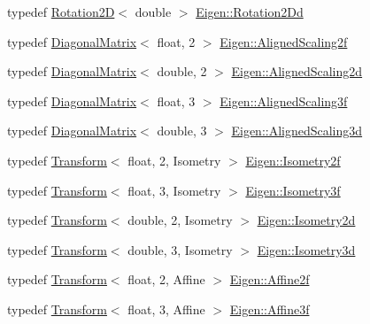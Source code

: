\begin{DoxyCompactItemize}
typedef \mbox{\hyperlink{class_eigen_1_1_rotation2_d}{Rotation2D}}$<$ double $>$ \mbox{\hyperlink{group___geometry___module_gab7af1ccdfb6c865c27fe1fd6bd9e759f}{Eigen\+::\+Rotation2\+Dd}}
\item 
typedef \mbox{\hyperlink{class_eigen_1_1_diagonal_matrix}{Diagonal\+Matrix}}$<$ float, 2 $>$ \mbox{\hyperlink{group___geometry___module_gaf2440178a1f5f6abef6ee0231bc49184}{Eigen\+::\+Aligned\+Scaling2f}}
\item 
typedef \mbox{\hyperlink{class_eigen_1_1_diagonal_matrix}{Diagonal\+Matrix}}$<$ double, 2 $>$ \mbox{\hyperlink{group___geometry___module_gaf8975289b8134a5021e806029516e82c}{Eigen\+::\+Aligned\+Scaling2d}}
\item 
typedef \mbox{\hyperlink{class_eigen_1_1_diagonal_matrix}{Diagonal\+Matrix}}$<$ float, 3 $>$ \mbox{\hyperlink{group___geometry___module_ga45caf8b0e6da378885f4ae3f06c5cde3}{Eigen\+::\+Aligned\+Scaling3f}}
\item 
typedef \mbox{\hyperlink{class_eigen_1_1_diagonal_matrix}{Diagonal\+Matrix}}$<$ double, 3 $>$ \mbox{\hyperlink{group___geometry___module_ga0aff001d5740f13797c9acd4e3276673}{Eigen\+::\+Aligned\+Scaling3d}}
\item 
typedef \mbox{\hyperlink{class_eigen_1_1_transform}{Transform}}$<$ float, 2, Isometry $>$ \mbox{\hyperlink{group___geometry___module_ga8262f9f26bd97dbb1688a10ca323e534}{Eigen\+::\+Isometry2f}}
\item 
typedef \mbox{\hyperlink{class_eigen_1_1_transform}{Transform}}$<$ float, 3, Isometry $>$ \mbox{\hyperlink{group___geometry___module_gad3de6a5dfd9da64bf0970995f9cbc032}{Eigen\+::\+Isometry3f}}
\item 
typedef \mbox{\hyperlink{class_eigen_1_1_transform}{Transform}}$<$ double, 2, Isometry $>$ \mbox{\hyperlink{group___geometry___module_ga517183233a93969160a02b10d0a898f1}{Eigen\+::\+Isometry2d}}
\item 
typedef \mbox{\hyperlink{class_eigen_1_1_transform}{Transform}}$<$ double, 3, Isometry $>$ \mbox{\hyperlink{group___geometry___module_ga5a91dba9c396daa1eb0a4d08566c4e9e}{Eigen\+::\+Isometry3d}}
\item 
typedef \mbox{\hyperlink{class_eigen_1_1_transform}{Transform}}$<$ float, 2, Affine $>$ \mbox{\hyperlink{group___geometry___module_gae90bfea5b980efcaadf9168ae6481d11}{Eigen\+::\+Affine2f}}
\item 
typedef \mbox{\hyperlink{class_eigen_1_1_transform}{Transform}}$<$ float, 3, Affine $>$ \mbox{\hyperlink{group___geometry___module_ga3902f2f19737ec9f16189e218919c505}{Eigen\+::\+Affine3f}}

\end{DoxyCompactItemize}
